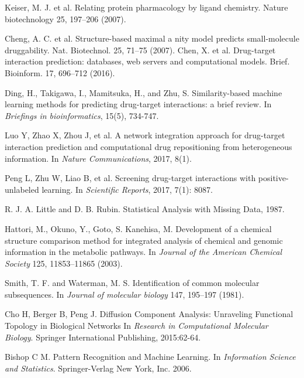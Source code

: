 \documentclass[conference]{IEEEtran}
\begin{document}
\begin{thebibliography}{10}

Keiser, M. J. et al. Relating protein pharmacology by ligand chemistry. Nature biotechnology 25, 197–206 (2007).

Cheng, A. C. et al. Structure-based maximal a nity model predicts small-molecule druggability. Nat. Biotechnol. 25, 71–75 (2007).
Chen, X. et al. Drug-target interaction prediction: databases, web servers and computational models. Brief. Bioinform. 17, 696–712 (2016).

Ding, H., Takigawa, I., Mamitsuka, H., and Zhu, S.
\newblock Similarity-based machine learning methods for predicting drug-target interactions: a brief review. \newblock In {\em Briefings in bioinformatics}, 15(5), 734-747.


Luo Y, Zhao X, Zhou J, et al.
\newblock A network integration approach for drug-target interaction prediction and computational drug repositioning from heterogeneous information.
\newblock In {\em Nature Communications}, 2017, 8(1).


Peng L, Zhu W, Liao B, et al.
\newblock Screening drug-target interactions with positive-unlabeled learning.
\newblock In {\em Scientific Reports}, 2017, 7(1): 8087.

R. J. A. Little and D. B. Rubin.
\newblock Statistical Analysis with Missing Data, 1987.

Hattori, M., Okuno, Y., Goto, S.  Kanehisa, M. 
\newblock Development of a chemical structure comparison method for integrated analysis of chemical and genomic information in the metabolic pathways. 
\newblock In {\em Journal of the American Chemical Society} 125, 11853–11865 (2003).

Smith, T. F. and Waterman, M. S. 
\newblock Identification of common molecular subsequences. 
\newblock In {\em Journal of molecular biology} 147, 195–197 (1981).


Cho H, Berger B, Peng J. 
\newblock Diffusion Component Analysis: Unraveling Functional Topology in Biological Networks
\newblock In {\em Research in Computational Molecular Biology}. Springer International Publishing, 2015:62-64.


Bishop C M. 
\newblock Pattern Recognition and Machine Learning. 
\newblock In {\em Information Science and Statistics}. Springer-Verlag New York, Inc. 2006.


\end{thebibliography}
\end{document}
